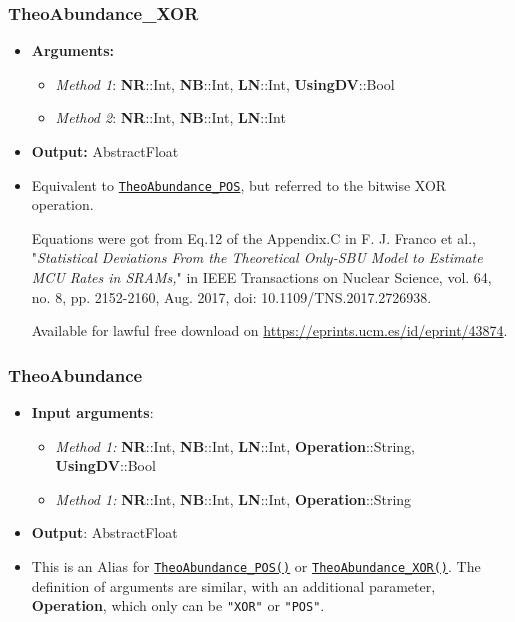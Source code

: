 \subsubsection*{TheoAbundance\_XOR}\label{Subsec:TheoAbundance_XOR}
%
\begin{itemize}
	\item \textbf{Arguments:}
	\begin{itemize}
		\item \textit{Method 1}: \textbf{NR}::Int, \textbf{NB}::Int, \textbf{LN}::Int, \textbf{UsingDV}::Bool
		\item \textit{Method 2}: \textbf{NR}::Int, \textbf{NB}::Int, \textbf{LN}::Int
	\end{itemize}
	\item \textbf{Output:} AbstractFloat
	\item Equivalent to \hyperref[Subsec:TheoAbundance_POS]{\texttt{TheoAbundance\_POS}}, but referred to the bitwise XOR operation. 
	
	Equations were got from Eq.12 of the Appendix.C in 
	F. J. Franco et al., "\textit{Statistical Deviations From the Theoretical Only-SBU
		Model to Estimate MCU Rates in SRAMs,}" in IEEE Transactions on Nuclear
	Science, vol. 64, no. 8, pp. 2152-2160, Aug. 2017,
	doi: 10.1109/TNS.2017.2726938. 
	
	Available for lawful free download on  \href{https://eprints.ucm.es/id/eprint/43874}{https://eprints.ucm.es/id/eprint/43874}.
\end{itemize}
%
\subsubsection*{TheoAbundance}\label{Subsec:TheoAbundance}
%
\begin{itemize}
	\item \textbf{Input arguments}:
	\begin{itemize}
		\item \textit{Method 1:} \textbf{NR}::Int, \textbf{NB}::Int, \textbf{LN}::Int, \textbf{Operation}::String, \textbf{UsingDV}::Bool
		\item \textit{Method 1:} \textbf{NR}::Int, \textbf{NB}::Int, \textbf{LN}::Int, \textbf{Operation}::String
	\end{itemize}
	\item \textbf{Output}: AbstractFloat
	\item This is an Alias for \hyperref[Subsec:TheoAbundance_POS]{ \texttt{TheoAbundance\_POS()}} or \hyperref[Subsec:TheoAbundance_XOR]{ \texttt{TheoAbundance\_XOR()}}. The definition of arguments are similar, with an additional parameter, \textbf{Operation}, which only can be \texttt{"XOR"} or \texttt{"POS"}. 
	
\end{itemize}

